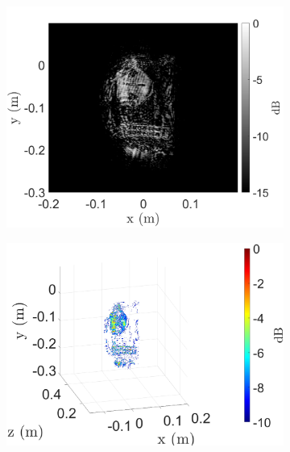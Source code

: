\documentclass{ieeeaccess}
\begin{document}
\begin{figure}[h]
\begin{subfigure}[b]{0.245\textwidth}
         \includegraphics[width=\textwidth]{smith26.png} %
         \caption{}
         \label{fig:exp3_purse_BPA_2D}
    \end{subfigure}
    \hfill
    \begin{subfigure}[b]{0.245\textwidth}
         \centering
         \includegraphics[width=\textwidth]{smith27.png} %
         \caption{}
         \label{fig:exp3_purse_BPA_3D}
    \end{subfigure}
    \hfill
    \begin{subfigure}[b]{0.245\textwidth}
         \centering

\end{subfigure}
\end{figure}
\end{document}
